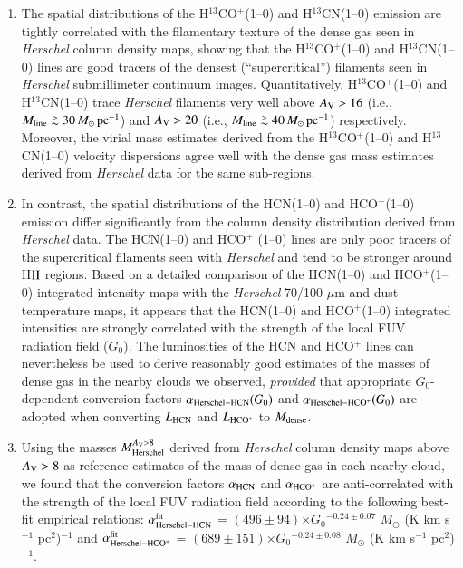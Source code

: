 \documentclass{aa}
\def\gtsima{$\; \buildrel > \over \sim \;$}
\def\simgt{\lower.5ex\hbox{\gtsima}}
\begin{document}
{{\begin{enumerate}
\item The spatial distributions of the H$^{13}$CO$^+$(1--0) and H$^{13}$CN(1--0) emission are tightly correlated 
with the filamentary texture of the dense gas seen in {\it Herschel} column density maps, 
showing that the H$^{13}$CO$^+$(1--0) and H$^{13}$CN(1--0) lines are  
good tracers of the densest (``supercritical'') filaments seen in {\it Herschel} submillimeter continuum images. 
Quantitatively, H$^{13}$CO$^+$(1--0) and H$^{13}$CN(1--0) trace {\it Herschel} filaments very well 
above $A_{\rm V} > 16$ (i.e., $M_{\rm line} \simgt 30\, M_\odot \, {\rm pc}^{-1} $) 
and $A_{\rm V} > 20$ (i.e., $M_{\rm line} \simgt 40\, M_\odot \, {\rm pc}^{-1} $) respectively. 
Moreover, the virial mass estimates derived from the H$^{13}$CO$^+$(1--0) and H$^{13}$CN(1--0) velocity 
dispersions agree well with the dense gas mass estimates derived from {\it Herschel} data for the same sub-regions.

\item In contrast, the spatial distributions of the HCN(1--0) and HCO$^+$(1--0) emission differ significantly 
from the column density distribution derived from {\it Herschel} data. The HCN(1--0) and HCO$^+$ (1--0) lines 
are only poor tracers of the supercritical filaments seen with {\it Herschel} and tend to be stronger 
around H${\rm II}$ regions. 
Based on a detailed comparison of the HCN(1--0) and HCO$^+$(1--0) integrated intensity maps
with the {\it Herschel} 70/100 $\mu$m and dust temperature maps, it appears that 
the HCN(1--0) and HCO$^+$(1--0) integrated intensities are strongly correlated with the strength of the local FUV radiation field ($G_0$). 
The luminosities of the HCN and HCO$^+$ lines can nevertheless be used to derive reasonably good estimates of the 
masses of dense gas in the nearby clouds we observed, {\it provided} that appropriate $G_0$-dependent conversion factors
$\alpha_{\rm Herschel-HCN}(G_0)$ and $\alpha_{\rm Herschel-HCO^+}(G_0)$ are adopted 
when converting $L_{\rm HCN}$ and $L_{\rm HCO^+}$ to $M_{\rm dense}$.


\item 
Using the masses $M_{\rm Herschel}^{A_{\rm V}>8}$ derived from {\it Herschel} column density maps above $A_{\rm V} > 8$ as reference estimates of the mass of dense gas in each nearby cloud, we found that  the conversion factors $\alpha_{\rm HCN}$ and $\alpha_{\rm HCO^+}$ are anti-correlated with the strength of the local FUV radiation field according to the following best-fit empirical relations:
$\alpha_{\rm Herschel-HCN}^{\rm fit}$ = $(496\pm94)$$\times$$G_0$$^{-0.24\pm0.07}$ $M_{\odot}$ (K km s$^{-1}$ pc$^2$)$^{-1}$ and $\alpha_{\rm Herschel-HCO^+}^{\rm fit}$ = $(689\pm151)$$\times$$G_0$$^{-0.24\pm0.08}$ $M_{\odot}$ (K km s$^{-1}$ pc$^2$)$^{-1}$.



\end{enumerate}}}
\end{document}
